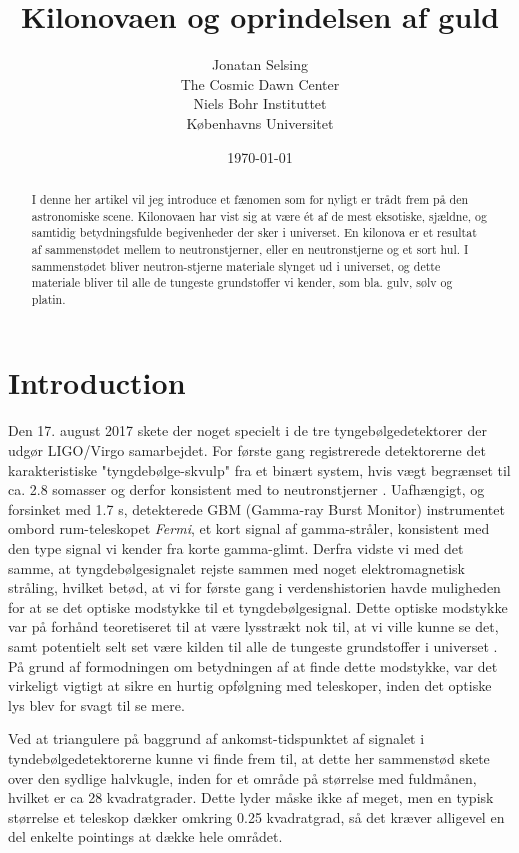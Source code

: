 \documentclass{article}
\title{Kilonovaen og oprindelsen af guld}
\author{Jonatan Selsing \\
	The Cosmic Dawn Center \\
	 Niels Bohr Instituttet  \\
	 Københavns Universitet \\
	}
\date{\today}
\begin{document}
\maketitle


\begin{abstract}
I denne her artikel vil jeg introduce et fænomen som for nyligt er trådt frem på den astronomiske scene. Kilonovaen har vist sig at være ét af de mest eksotiske, sjældne, og samtidig betydningsfulde begivenheder der sker i universet. En kilonova er et resultat af sammenstødet mellem to neutronstjerner, eller en neutronstjerne og et sort hul. I sammenstødet bliver neutron-stjerne materiale slynget ud i universet, og dette materiale bliver til alle de tungeste grundstoffer vi kender, som bla. gulv, sølv og platin. 
\end{abstract}

\section{Introduction}
Den 17. august 2017 skete der noget specielt i de tre tyngebølgedetektorer der udgør LIGO/Virgo samarbejdet. For første gang registrerede detektorerne det karakteristiske "tyngdebølge-skvulp" fra et binært system, hvis vægt begrænset til ca. 2.8 somasser og derfor konsistent med to neutronstjerner \cite{abbott}. Uafhængigt, og forsinket med 1.7 s, detekterede GBM (Gamma-ray Burst Monitor) instrumentet ombord rum-teleskopet \textit{Fermi}, et kort signal af gamma-stråler, konsistent med den type signal vi kender fra korte gamma-glimt. Derfra vidste vi med det samme, at tyngdebølgesignalet rejste sammen med noget elektromagnetisk stråling, hvilket betød, at vi for første gang i verdenshistorien havde muligheden for at se det optiske modstykke til et tyngdebølgesignal. Dette optiske modstykke var på forhånd teoretiseret til at være lysstrækt nok til, at vi ville kunne se det, samt potentielt selt set være kilden til alle de tungeste grundstoffer i universet \cite{lattimer}. På grund af formodningen om betydningen af at finde dette modstykke, var det virkeligt vigtigt at sikre en hurtig opfølgning med teleskoper, inden det optiske lys blev for svagt til se mere. 

Ved at triangulere på baggrund af ankomst-tidspunktet af signalet i tyndebølgedetektorerne kunne vi finde frem til, at dette her sammenstød skete over den sydlige halvkugle, inden for et område på størrelse med fuldmånen, hvilket er ca 28 kvadratgrader. Dette lyder måske ikke af meget, men en typisk størrelse et teleskop dækker omkring  0.25 kvadratgrad, så det kræver alligevel en del enkelte pointings at dække hele området. 
\end{document}
